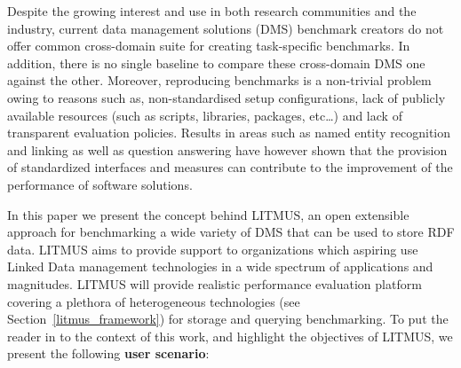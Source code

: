 \documentclass{llncs}
\begin{document}
Despite the growing interest and use in both research communities and the industry, current data management solutions (DMS) benchmark creators \cite{Bizer2009TheBS,alucc2014diversified} do not offer common cross-domain suite for creating task-specific benchmarks. In addition, there is no single baseline to compare these cross-domain DMS one against the other. 
Moreover, reproducing benchmarks is a non-trivial problem owing to reasons such as, non-standardised setup configurations, lack of publicly available resources (such as scripts, libraries, packages, etc\dots) and lack of transparent evaluation policies. 
Results in areas such as named entity recognition and linking \cite{gerbil} as well as question answering \cite{qald,bioasq} have however shown that the provision of standardized interfaces and measures can contribute to the improvement of the performance of software solutions.
    
In this paper we present the concept behind LITMUS, an open extensible approach for benchmarking a wide variety of DMS that can be used to store RDF data. 
LITMUS aims to provide support to organizations which aspiring use Linked Data management technologies in a wide spectrum of applications and magnitudes. 
LITMUS will provide realistic performance evaluation platform covering a plethora of heterogeneous technologies (see Section~\ref{litmus_framework}) for storage and querying benchmarking. 
To put the reader in to the context of this work, and highlight the objectives of LITMUS, we present the following \textbf{user scenario}: 
    
\end{document}
